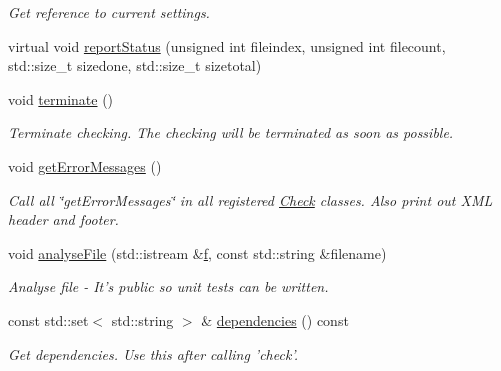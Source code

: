 \begin{DoxyCompactItemize}
\begin{DoxyCompactList}\small\item\em Get reference to current settings. \end{DoxyCompactList}\item 
virtual void \hyperlink{class_cpp_check_a2eef5d46d6a5429f894f99b376080857}{report\-Status} (unsigned int fileindex, unsigned int filecount, std\-::size\-\_\-t sizedone, std\-::size\-\_\-t sizetotal)
\item 
void \hyperlink{class_cpp_check_a07744b4ff60e30445c3ec1c40ab9c498}{terminate} ()
\begin{DoxyCompactList}\small\item\em Terminate checking. The checking will be terminated as soon as possible. \end{DoxyCompactList}\item 
void \hyperlink{class_cpp_check_ad1e2d0f1164013a0c9575100603dfc32}{get\-Error\-Messages} ()
\begin{DoxyCompactList}\small\item\em Call all \char`\"{}get\-Error\-Messages\char`\"{} in all registered \hyperlink{class_check}{Check} classes. Also print out X\-M\-L header and footer. \end{DoxyCompactList}\item 
void \hyperlink{class_cpp_check_ab101f0b89614e74fb573fe281c84b5d0}{analyse\-File} (std\-::istream \&\hyperlink{test_8cxx_ae8618ff1d2d0e398883406408a769cba}{f}, const std\-::string \&filename)
\begin{DoxyCompactList}\small\item\em Analyse file -\/ It's public so unit tests can be written. \end{DoxyCompactList}\item 
const std\-::set$<$ std\-::string $>$ \& \hyperlink{class_cpp_check_aa1c9b7a357b84bf62f1132a221b243a4}{dependencies} () const 
\begin{DoxyCompactList}\small\item\em Get dependencies. Use this after calling 'check'. \end{DoxyCompactList}\end{DoxyCompactItemize}
